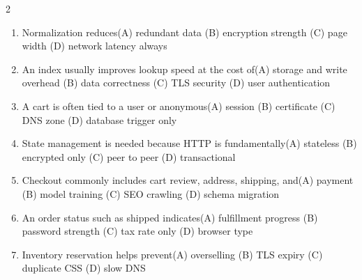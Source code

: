 \documentclass[a4paper]{article}
\begin{document}
\begin{multicols*}{2}
\begin{enumerate}
\item Normalization reduces\newline\hspace*{0.6em}(A) redundant data \quad (B) encryption strength \newline\hspace*{0.6em}(C) page width \quad (D) network latency always
\item An index usually improves lookup speed at the cost of\newline\hspace*{0.6em}(A) storage and write overhead \quad (B) data correctness \newline\hspace*{0.6em}(C) TLS security \quad (D) user authentication
\item A cart is often tied to a user or anonymous\newline\hspace*{0.6em}(A) session \quad (B) certificate \newline\hspace*{0.6em}(C) DNS zone \quad (D) database trigger only
\item State management is needed because HTTP is fundamentally\newline\hspace*{0.6em}(A) stateless \quad (B) encrypted only \newline\hspace*{0.6em}(C) peer to peer \quad (D) transactional
\item Checkout commonly includes cart review, address, shipping, and\newline\hspace*{0.6em}(A) payment \quad (B) model training \newline\hspace*{0.6em}(C) SEO crawling \quad (D) schema migration
\item An order status such as shipped indicates\newline\hspace*{0.6em}(A) fulfillment progress \quad (B) password strength \newline\hspace*{0.6em}(C) tax rate only \quad (D) browser type
\item Inventory reservation helps prevent\newline\hspace*{0.6em}(A) overselling \quad (B) TLS expiry \newline\hspace*{0.6em}(C) duplicate CSS \quad (D) slow DNS

\end{enumerate}
\end{multicols*}
\end{document}

